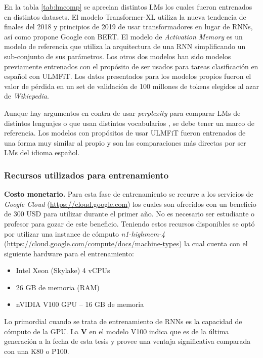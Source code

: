 En la tabla \ref{tab:lmcomp} se aprecian distintos LMs los cuales fueron entrenados en distintos datasets. El modelo Transformer-XL \parencite{dai2019} utiliza la nueva tendencia de finales del 2018 y principios de 2019 de usar transformadores en lugar de RNNs, así como propone Google con BERT. El modelo de \textit{Activation Memory} \parencite{rae2018} es un modelo de referencia que utiliza la arquitectura de una RNN simplificando un sub-conjunto de sus parámetros. Los otros dos modelos han sido modelos previamente entrenados con el propósito de ser usados para tareas clasificación en español con ULMFiT. Los datos presentados para los modelos propios fueron el valor de pérdida en un set de validación de 100 millones de tokens elegidos al azar de \textit{Wikiepedia}.

Aunque hay argumentos en contra de usar \textit{perplexity} para comparar LMs de distintos lenguajes o que usan distintos vocabularios \parencite{chen1998evaluation}, se debe tener un marco de referencia. Los modelos con propósitos de usar ULMFiT fueron entrenados de una forma muy similar al propio y son las comparaciones más directas por ser LMs del idioma español.


\subsubsection{Recursos utilizados para entrenamiento}

\textbf{Costo monetario.} Para esta fase de entrenamiento se recurre a los servicios de \textit{Google Cloud} (\href{https://cloud.google.com/free}{https://cloud.google.com}) los cuales son ofrecidos con un beneficio de 300 USD para utilizar durante el primer año. No es necesario ser estudiante o profesor para gozar de este beneficio. Teniendo estos recursos disponibles se optó por utilizar una instance de cómputo \emph{n1-highmem-4} (\url{https://cloud.google.com/compute/docs/machine-types}) la cual cuenta con	el siguiente hardware para el entrenamiento:


\begin{itemize}
\item Intel Xeon (Skylake) 4 vCPUs
\item 26 GB de memoria (RAM)
\item nVIDIA V100 GPU -- 16 GB de memoria
\end{itemize}

Lo primordial cuando se trata de entrenamiento de RNNs es la capacidad de cómputo de la GPU. La \textbf{V} en el modelo V100 indica que es de la última generación a la fecha de esta tesis y provee una ventaja significativa comparada con una K80 o P100.

